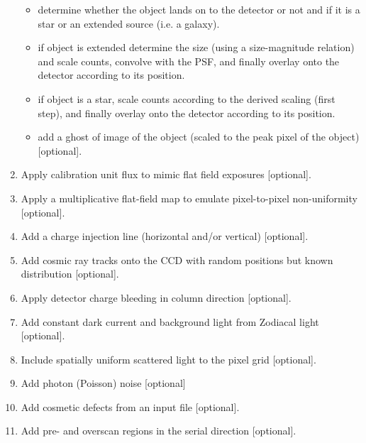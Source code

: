 \documentclass[a4paper,11pt,english]{sphinxmanual}
\begin{document}
\begin{enumerate}
\begin{itemize}
\item {} 
determine whether the object lands on to the detector or not and if it is
a star or an extended source (i.e. a galaxy).

\item {} 
if object is extended determine the size (using a size-magnitude relation) and scale counts,
convolve with the PSF, and finally overlay onto the detector according to its position.

\item {} 
if object is a star, scale counts according to the derived
scaling (first step), and finally overlay onto the detector according to its position.

\item {} 
add a ghost of image of the object (scaled to the peak pixel of the object) {[}optional{]}.

\end{itemize}

\item {} 
Apply calibration unit flux to mimic flat field exposures {[}optional{]}.

\item {} 
Apply a multiplicative flat-field map to emulate pixel-to-pixel non-uniformity {[}optional{]}.

\item {} 
Add a charge injection line (horizontal and/or vertical) {[}optional{]}.

\item {} 
Add cosmic ray tracks onto the CCD with random positions but known distribution {[}optional{]}.

\item {} 
Apply detector charge bleeding in column direction {[}optional{]}.

\item {} 
Add constant dark current and background light from Zodiacal light {[}optional{]}.

\item {} 
Include spatially uniform scattered light to the pixel grid {[}optional{]}.

\item {} 
Add photon (Poisson) noise {[}optional{]}

\item {} 
Add cosmetic defects from an input file {[}optional{]}.

\item {} 
Add pre- and overscan regions in the serial direction {[}optional{]}.


\end{enumerate}
\end{document}
